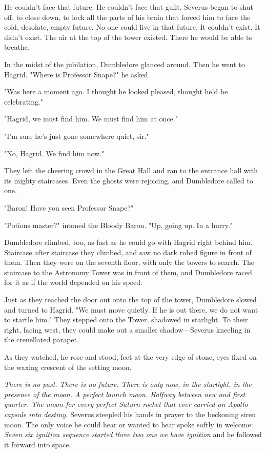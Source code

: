 He couldn't face that future. He couldn't face that guilt. Severus began to shut off, to close down, to lock all the parts of his brain that forced him to face the cold, desolate, empty future. No one could live in that future. It couldn't exist. It didn't exist. The air at the top of the tower existed. There he would be able to breathe.

In the midst of the jubilation, Dumbledore glanced around. Then he went to Hagrid. "Where is Professor Snape?" he asked.

"Was here a moment ago. I thought he looked pleased, thought he'd be celebrating."

"Hagrid, we must find him. We must find him at once."

"I'm sure he's just gone somewhere quiet, sir."

"No, Hagrid. We find him now."

They left the cheering crowd in the Great Hall and ran to the entrance hall with its mighty staircases. Even the ghosts were rejoicing, and Dumbledore called to one.

"Baron! Have you seen Professor Snape?"

"Potions master?" intoned the Bloody Baron. "Up, going up. In a hurry."

Dumbledore climbed, too, as fast as he could go with Hagrid right behind him. Staircase after staircase they climbed, and saw no dark robed figure in front of them. Then they were on the seventh floor, with only the towers to search. The staircase to the Astronomy Tower was in front of them, and Dumbledore raced for it as if the world depended on his speed.

Just as they reached the door out onto the top of the tower, Dumbledore slowed and turned to Hagrid. "We must move quietly. If he is out there, we do not want to startle him." They stepped onto the Tower, shadowed in starlight. To their right, facing west, they could make out a smaller shadow—Severus kneeling in the crenellated parapet.

As they watched, he rose and stood, feet at the very edge of stone, eyes fixed on the waxing crescent of the setting moon.

\emph{There is no past. There is no future. There is only now, in the starlight, in the presence of the moon. A perfect launch moon. Halfway between new and first quarter. The moon for every perfect Saturn rocket that ever carried an Apollo capsule into destiny.} Severus steepled his hands in prayer to the beckoning siren moon. The only voice he could hear or wanted to hear spoke softly in welcome: \emph{Seven{\el} six{\el} ignition sequence started{\el} three{\el} two{\el} one{\el} we have ignition{\el}} and he followed it forward into space.

